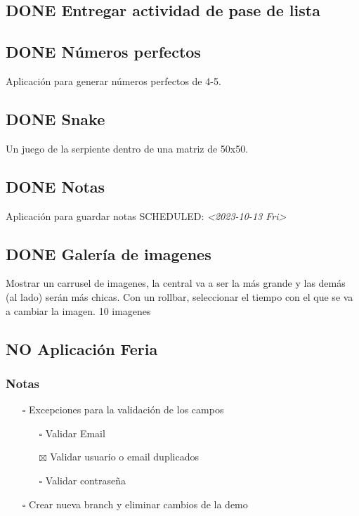 \documentclass[11pt]{article}
\begin{document}
\subsection{{\bfseries\sffamily DONE} Entregar actividad de pase de lista}
\label{sec:org9dbd0a6}
\subsection{{\bfseries\sffamily DONE} Números perfectos}
\label{sec:orge2187d3}
Aplicación para generar números perfectos de 4-5.
\subsection{{\bfseries\sffamily DONE} Snake}
\label{sec:org907cddc}
Un juego de la serpiente dentro de una matriz de 50x50.
\subsection{{\bfseries\sffamily DONE} Notas}
\label{sec:org8f509b0}
Aplicación para guardar notas
SCHEDULED: \textit{<2023-10-13 Fri>}
\subsection{{\bfseries\sffamily DONE} Galería de imagenes}
\label{sec:orgd178174}
Mostrar un carrusel de imagenes, la central va a ser la más grande y las
demás (al lado) serán más chicas. Con un rollbar, seleccionar el tiempo
con el que se va a cambiar la imagen. 10 imagenes
\subsection{{\bfseries\sffamily NO} Aplicación Feria}
\label{sec:orgc5f94b5}
\subsubsection{Notas}
\label{sec:orgd04101d}
\begin{itemize}
\item[{$\square$}] Excepciones para la validación de los campos
\begin{itemize}
\item[{$\square$}] Validar Email
\item[{$\boxtimes$}] Validar usuario o email duplicados
\item[{$\square$}] Validar contraseña
\end{itemize}
\item[{$\square$}] Crear nueva branch y eliminar cambios de la demo
\end{itemize}
\end{document}
